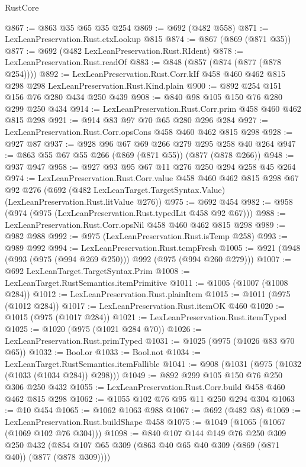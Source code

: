 \begin{lexlean}{RustCore}
\begin{coremodule}
@867 := @863 @35 @65 @35 @254
@869 := @692 (@482 @558)
@871 := LexLeanPreservation.Rust.ctxLookup @815
@874 := @867 (@869 (@871 @35))
@877 := @692 (@482 LexLeanPreservation.Rust.RIdent)
@878 := LexLeanPreservation.Rust.readOf
@883 := @848 (@857 (@874 (@877 (@878 @254))))
@892 := LexLeanPreservation.Rust.Corr.kIf
    @458
    @460
    @462
    @815
    @298
    @298
    LexLeanPreservation.Rust.Kind.plain
@900 := @892 @254 @151 @156 @76 @280 @434 @250 @439
@908 := @840 @98 @105 @150 @76 @280 @299 @250 @434
@914 := LexLeanPreservation.Rust.Corr.prim @458 @460 @462 @815 @298
@921 := @914 @83 @97 @70 @65 @280 @296 @284
@927 := LexLeanPreservation.Rust.Corr.opsCons @458 @460 @462 @815 @298
@928 := @927 @87
@937 := @928 @96 @67 @69 @266 @279 @295 @258 @40 @264
@947 := @863 @55 @67 @55 @266 (@869 (@871 @55)) (@877 (@878 @266))
@948 := @937 @947
@958 := @927 @93 @95 @67 @11 @276 @250 @294 @258 @45 @264
@974 := LexLeanPreservation.Rust.Corr.value
    @458
    @460
    @462
    @815
    @298
    @67
    @92
    @276
    (@692 (@482 LexLeanTarget.TargetSyntax.Value) (LexLeanPreservation.Rust.litValue @276))
@975 := @692 @454
@982 := @958 (@974 (@975 (LexLeanPreservation.Rust.typedLit @458 @92 @67)))
@988 := LexLeanPreservation.Rust.Corr.opsNil @458 @460 @462 @815 @298
@989 := @982 @988
@992 := @975 (LexLeanPreservation.Rust.isTemp @258)
@993 := @989 @992
@994 := LexLeanPreservation.Rust.tempFresh
@1005 := @921 (@948 (@993 (@975 (@994 @269 @250))) @992 (@975 (@994 @260 @279)))
@1007 := @692 LexLeanTarget.TargetSyntax.Prim
@1008 := LexLeanTarget.RustSemantics.itemPrimitive
@1011 := @1005 (@1007 (@1008 @284))
@1012 := LexLeanPreservation.Rust.plainItem
@1015 := @1011 (@975 (@1012 @284))
@1017 := LexLeanPreservation.Rust.itemOK @460
@1020 := @1015 (@975 (@1017 @284))
@1021 := LexLeanPreservation.Rust.itemTyped
@1025 := @1020 (@975 (@1021 @284 @70))
@1026 := LexLeanPreservation.Rust.primTyped
@1031 := @1025 (@975 (@1026 @83 @70 @65))
@1032 := Bool.or
@1033 := Bool.not
@1034 := LexLeanTarget.RustSemantics.itemFallible
@1041 := @908 (@1031 (@975 (@1032 (@1033 (@1034 @284)) @298)))
@1049 := @892 @299 @105 @150 @76 @250 @306 @250 @432
@1055 := LexLeanPreservation.Rust.Corr.build @458 @460 @462 @815 @298
@1062 := @1055 @102 @76 @95 @11 @250 @294 @304
@1063 := @10 @454
@1065 := @1062 @1063 @988
@1067 := @692 (@482 @8)
@1069 := LexLeanPreservation.Rust.buildShape @458
@1075 := @1049 (@1065 (@1067 (@1069 @102 @76 @304)))
@1098 := @840
    @107
    @144
    @149
    @76
    @250
    @309
    @250
    @432
    (@854 @107 @65 @309 (@863 @40 @65 @40 @309 (@869 (@871 @40)) (@877 (@878 @309))))

\end{coremodule}
\end{lexlean}
